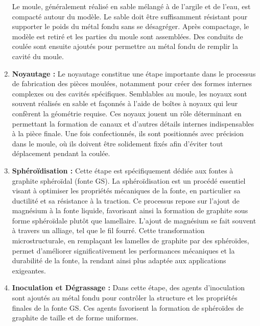 \documentclass[12pt]{article}
\begin{document}
\begin{enumerate}
    Le moule, généralement réalisé en sable mélangé à de l'argile et de 
    l'eau, est compacté autour du modèle. Le sable doit être suffisamment 
    résistant pour supporter le poids du métal fondu sans se désagréger. 
    Après compactage, le modèle est retiré et les parties du moule sont 
    assemblées. Des conduits de coulée sont ensuite ajoutés pour permettre 
    au métal fondu de remplir la cavité du moule.



    \item \textbf{Noyautage :} 
    Le noyautage constitue une étape importante dans le processus de 
    fabrication des pièces moulées, notamment pour créer des formes 
    internes complexes ou des cavités spécifiques. Semblables au moule, 
    les noyaux sont souvent réalisés en sable et façonnés à l'aide de 
    boîtes à noyaux qui leur confèrent la géométrie requise. Ces noyaux 
    jouent un rôle déterminant en permettant la formation de canaux et 
    d'autres détails internes indispensables à la pièce finale. 
    Une fois confectionnés, ils sont positionnés avec précision dans 
    le moule, où ils doivent être solidement fixés afin d'éviter 
    tout déplacement pendant la coulée.


    \item \textbf{Sphéroïdisation :} 
    Cette étape est spécifiquement dédiée aux fontes à graphite sphéroïdal 
    (fonte GS). La sphéroïdisation est un procédé essentiel visant à 
    optimiser les propriétés mécaniques de la fonte, en particulier sa 
    ductilité et sa résistance à la traction. Ce processus repose sur 
    l’ajout de magnésium à la fonte liquide, favorisant ainsi la formation 
    de graphite sous forme sphéroïdale plutôt que lamellaire. L'ajout de 
    magnésium se fait souvent à travers un alliage, tel que le fil fourré. 
    Cette transformation microstructurale, en remplaçant les lamelles de 
    graphite par des sphéroïdes, permet d'améliorer significativement les 
    performances mécaniques et la durabilité de la fonte, la rendant ainsi 
    plus adaptée aux applications exigeantes.



    \item \textbf{Inoculation et Dégrassage :} Dans cette étape, des agents d'inoculation sont 
    ajoutés au métal fondu pour contrôler la structure et les propriétés finales de 
    la fonte GS. Ces agents favorisent la formation de sphéroïdes de graphite de 
    taille et de forme uniformes.


\end{enumerate}
\end{document}
